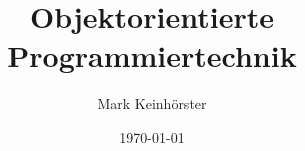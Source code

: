 \title{Objektorientierte Programmiertechnik}   
\author{Mark Keinh\"orster}
\date{\today}
\begin{frame}
\titlepage 
\end{frame} 

